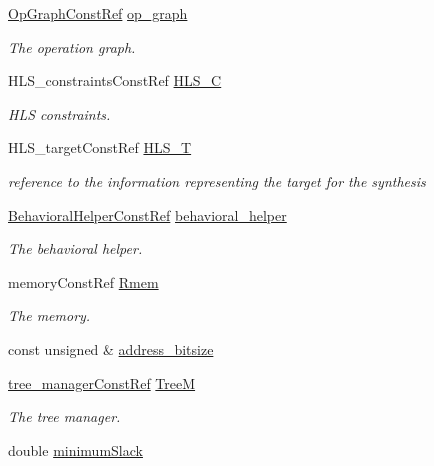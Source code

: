 \begin{DoxyCompactItemize}
\hyperlink{op__graph_8hpp_a9a0b240622c47584bee6951a6f5de746}{Op\+Graph\+Const\+Ref} \hyperlink{classAllocationInformation_a28a524a335d74a5e5bf8e32b98d4f8da}{op\+\_\+graph}
\begin{DoxyCompactList}\small\item\em The operation graph. \end{DoxyCompactList}\item 
H\+L\+S\+\_\+constraints\+Const\+Ref \hyperlink{classAllocationInformation_a6a845a360b25cc43a7f2bf62f45f9a7b}{H\+L\+S\+\_\+C}
\begin{DoxyCompactList}\small\item\em H\+LS constraints. \end{DoxyCompactList}\item 
H\+L\+S\+\_\+target\+Const\+Ref \hyperlink{classAllocationInformation_acf5858be8528292208147a24d0f6a3ca}{H\+L\+S\+\_\+T}
\begin{DoxyCompactList}\small\item\em reference to the information representing the target for the synthesis \end{DoxyCompactList}\item 
\hyperlink{behavioral__helper_8hpp_aae973b54cac87eef3b27442aa3e1e425}{Behavioral\+Helper\+Const\+Ref} \hyperlink{classAllocationInformation_ab357c71a89bef077a55c088e8c5ae710}{behavioral\+\_\+helper}
\begin{DoxyCompactList}\small\item\em The behavioral helper. \end{DoxyCompactList}\item 
memory\+Const\+Ref \hyperlink{classAllocationInformation_ab502323846396f9d124a4c6d3521bfd6}{Rmem}
\begin{DoxyCompactList}\small\item\em The memory. \end{DoxyCompactList}\item 
const unsigned \& \hyperlink{classAllocationInformation_ab0178c0f1c9a1e091273320cf5a938d2}{address\+\_\+bitsize}
\item 
\hyperlink{tree__manager_8hpp_a792e3f1f892d7d997a8d8a4a12e39346}{tree\+\_\+manager\+Const\+Ref} \hyperlink{classAllocationInformation_a6a3e2584d17181a42ac7dcd25bebe601}{TreeM}
\begin{DoxyCompactList}\small\item\em The tree manager. \end{DoxyCompactList}\item 
double \hyperlink{classAllocationInformation_af1e4a170f9ef84e34d3aafc5d38c50e1}{minimum\+Slack}

\end{DoxyCompactItemize}
